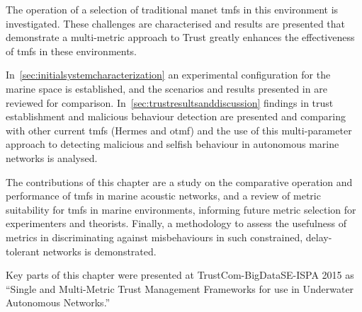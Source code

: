 The operation of a selection of traditional \gls{manet} \glspl{tmf} in this environment is investigated.
These challenges are characterised and results are presented that demonstrate a multi-metric approach to Trust greatly enhances the effectiveness of \glspl{tmf} in these environments.

In~\autoref{sec:initialsystemcharacterization} an experimental configuration for the marine space is established, and the scenarios and results presented in \cite{Guo11} are reviewed for comparison.
In~\autoref{sec:trustresultsanddiscussion} findings in trust establishment and malicious behaviour detection are presented and comparing with other current \glspl{tmf} (Hermes and \gls{otmf}) and the use of this multi-parameter approach to detecting malicious and selfish behaviour in autonomous marine networks is analysed.

The contributions of this chapter are a study on the comparative operation and performance of \glspl{tmf} in marine acoustic networks, and a review of metric suitability for \glspl{tmf} in marine environments, informing future metric selection for experimenters and theorists.
Finally, a methodology to assess the usefulness of metrics in discriminating against misbehaviours in such constrained, delay-tolerant networks is demonstrated.

Key parts of this chapter were presented at TrustCom-BigDataSE-ISPA 2015 as ``Single and Multi-Metric Trust Management Frameworks for use in Underwater Autonomous Networks.''\cite{Bolster2015}








